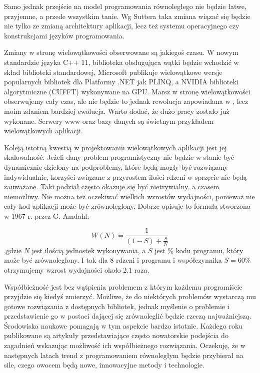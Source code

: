 Samo jednak przejście na model programowania równoległego nie będzie łatwe,
przyjemne, a przede wszystkim tanie. Wg
Suttera taka zmiana wiązać się będzie nie tylko ze zmianą architektury
aplikacji, lecz też systemu operacyjnego czy konstrukcjami języków
programowania. 

Zmiany w stronę wielowątkowości obserwowane są jakiegoś czasu. W nowym
standardzie języka C++ 11, biblioteka obsługująca wątki będzie wchodzić w skład
biblioteki standardowej, Microsoft publikuje wielowątkowe wersje popularnych
bibliotek dla Platformy .NET jak PLINQ, a NVIDIA biblioteki algorytmiczne
(CUFFT) wykonywane na GPU. Marsz w stronę wielowątkowości obserwujemy cały czas,
	ale nie będzie to jednak rewolucja zapowiadana w \cite{rewolucja}, lecz moim
	zdaniem bardziej ewolucja. Warto dodać, że dużo pracy zostało już wykonane.
	Serwery www oraz bazy danych są świetnym przykładem wielowątkowych
	aplikacji.

Koleją istotną kwestią w projektowaniu wielowątkowych aplikacji jest jej
skalowalność. Jeżeli dany problem programistyczny nie będzie w stanie być
dynamicznie dzielony na podproblemy, które będą mogły być rozwiązany
indywidualnie, korzyści związane z przyrostem ilości rdzeni w sprzęcie nie będą
zauważane. Taki podział często okazuje się być nietrywialny, a czasem
niemożliwy. Nie można też oczekiwać wielkich wzrostów wydajności, ponieważ nie
cały kod aplikacji może być zrównoleglony. Dobrze opisuje to formuła stworzona w
1967 r. przez G. Amdahl.

\begin{equation}
W(N) = \frac{1}{(1-S) + \frac{S}{N}}
\end{equation}
,gdzie $N$ jest ilością jednostek wykonywania, a $S$ jest \% kodu programu, który może być zrównoleglony. I tak dla 8 rdzeni i programu i współczynnika $S=60\%$ otrzymujemy wzrost wydajności około 2.1 raza.

Współbieżność jest bez wątpienia problemem z którym każdemu programiście
przyjdzie się kiedyś zmierzyć. Możliwe, że do niektórych problemów wystarczą mu
gotowe rozwiązania z dostępnych bibliotek, jednak myślenie o problemie i
przedstawienie go w postaci dającej się zrównoleglić będzie rzeczą
najważniejszą. Środowiska naukowe pomagają w tym aspekcie bardzo istotnie.
Każdego roku publikowane są artykuły przedstawiające często nowatorskie
podejścia do zagadnień wskazując możliwość ich współbieżnego rozwiązania.
Oczekuję, że w następnych latach trend z programowaniem równoległym będzie
przybierał na sile, czego owocem będą nowe, innowacyjne metody i technologie.

